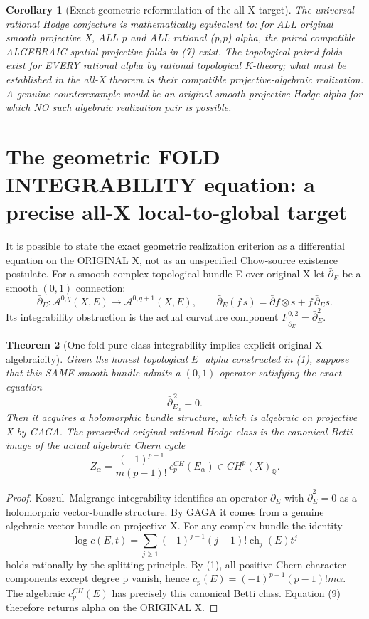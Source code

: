 \documentclass[11pt]{article}
\newtheorem{theorem}{Theorem}
\newtheorem{corollary}[theorem]{Corollary}
\begin{document}
\begin{corollary}[Exact geometric reformulation of the all-X target]
The universal rational Hodge conjecture is
mathematically equivalent to:
for ALL original smooth projective X, ALL p and
ALL rational (p,p) alpha, the paired compatible
ALGEBRAIC spatial projective folds in (7) exist.
The topological paired folds exist for EVERY
rational alpha by rational topological K-theory;
what must be established in the all-X theorem
is their compatible projective-algebraic realization.
A genuine counterexample would be an original
smooth projective Hodge alpha for which NO such
algebraic realization pair is possible.
\end{corollary}

\section{The geometric FOLD INTEGRABILITY equation: a precise all-X local-to-global target}

It is possible to state the exact geometric realization
criterion as a differential equation on the ORIGINAL X,
not as an unspecified Chow-source existence postulate.
For a smooth complex topological bundle E over original X
let $\bar\partial_E$ be a smooth $(0,1)$ connection:
\[
 \bar\partial_E:
 \mathcal A^{0,q}(X,E)\longrightarrow
 \mathcal A^{0,q+1}(X,E),\qquad
 \bar\partial_E(f\,s)=\bar\partial f\otimes s+
             f\,\bar\partial_Es.
\]
Its integrability obstruction is the actual curvature
component $F_{\bar\partial_E}^{0,2}
 =\bar\partial_E^2$.

\begin{theorem}[One-fold pure-class integrability implies explicit original-X algebraicity]
Given the honest topological E_alpha constructed in (1),
suppose that this SAME smooth bundle admits a
$(0,1)$-operator satisfying the exact equation
\[
 \boxed{\bar\partial_{E_\alpha}^{\,2}=0.}          \tag{8}
\]
Then it acquires a holomorphic bundle structure,
which is algebraic on projective X by GAGA.
The prescribed original rational Hodge class is
the canonical Betti image of the actual
algebraic Chern cycle
\[
 \boxed{
 Z_\alpha=\frac{(-1)^{p-1}}{m(p-1)!}\,
             c_p^{CH}(E_\alpha)
       \in CH^p(X)_{\mathbb Q}.
 }                                                        \tag{9}
\]
\end{theorem}
\begin{proof}
Koszul--Malgrange integrability identifies an operator
$\bar\partial_E$ with $\bar\partial_E^2=0$ as a
holomorphic vector-bundle structure. By GAGA
it comes from a genuine algebraic vector bundle
on projective X.
For any complex bundle the identity
\[
 \log c(E,t)=\sum_{j\ge1}(-1)^{j-1}
                    (j-1)!\operatorname{ch}_j(E)t^j
                                                               \tag{10}
\]
holds rationally by the splitting principle.
By (1), all positive Chern-character components
except degree p vanish, hence
$c_p(E)=(-1)^{p-1}(p-1)!m\alpha$.
The algebraic $c_p^{CH}(E)$ has precisely
this canonical Betti class. Equation (9)
therefore returns alpha on the ORIGINAL X.
\end{proof}
\end{document}
